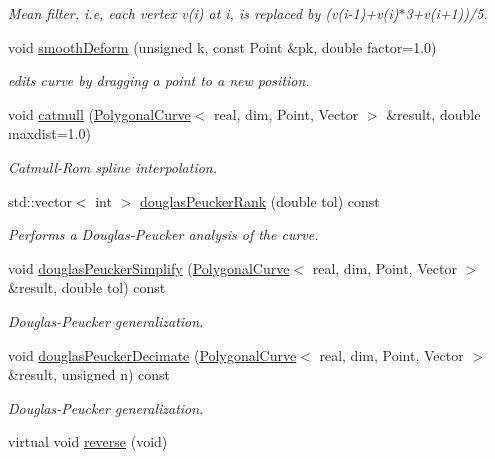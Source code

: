 \begin{DoxyCompactItemize}
\begin{DoxyCompactList}\small\item\em Mean filter, i.e, each vertex v(i) at i, is replaced by (v(i-\/1)+v(i)$\ast$3+v(i+1))/5. \end{DoxyCompactList}\item 
void \hyperlink{classPolygonalCurve_afce0ea85ac28869391b92a0e24a13efb}{smoothDeform} (unsigned k, const Point \&pk, double factor=1.0)
\begin{DoxyCompactList}\small\item\em edits curve by dragging a point to a new position. \end{DoxyCompactList}\item 
void \hyperlink{classPolygonalCurve_aded20ee80982eb92417e508d526f9f4d}{catmull} (\hyperlink{classPolygonalCurve}{PolygonalCurve}$<$ real, dim, Point, Vector $>$ \&result, double maxdist=1.0)
\begin{DoxyCompactList}\small\item\em Catmull-\/Rom spline interpolation. \end{DoxyCompactList}\item 
std::vector$<$ int $>$ \hyperlink{classPolygonalCurve_a2307793ef6aff73c011d2bc980cb5c08}{douglasPeuckerRank} (double tol) const 
\begin{DoxyCompactList}\small\item\em Performs a Douglas-\/Peucker analysis of the curve. \end{DoxyCompactList}\item 
void \hyperlink{classPolygonalCurve_a2acb3fdc82de8be9922e658cf3ccdbbe}{douglasPeuckerSimplify} (\hyperlink{classPolygonalCurve}{PolygonalCurve}$<$ real, dim, Point, Vector $>$ \&result, double tol) const 
\begin{DoxyCompactList}\small\item\em Douglas-\/Peucker generalization. \end{DoxyCompactList}\item 
void \hyperlink{classPolygonalCurve_a7c5d175c31b6f08f7c07553f27572087}{douglasPeuckerDecimate} (\hyperlink{classPolygonalCurve}{PolygonalCurve}$<$ real, dim, Point, Vector $>$ \&result, unsigned n) const 
\begin{DoxyCompactList}\small\item\em Douglas-\/Peucker generalization. \end{DoxyCompactList}\item 
\hypertarget{classPolygonalCurve_a67340995609e25d4f3311c708faf3669}{
virtual void \hyperlink{classPolygonalCurve_a67340995609e25d4f3311c708faf3669}{reverse} (void)}
\label{classPolygonalCurve_a67340995609e25d4f3311c708faf3669}


\end{DoxyCompactItemize}
